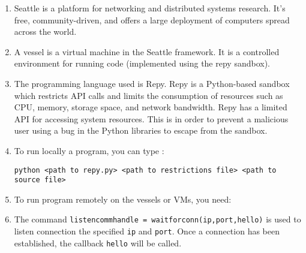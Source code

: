 \documentclass[12pt]{article}
\newcommand{\bash}[1]{\texttt{#1}}
\begin{document}
\begin{enumerate}
\item Seattle is a platform for networking and distributed systems research. It's free, community-driven, and offers a large deployment of computers spread across the world.

\item A vessel is a virtual machine in the Seattle framework. It is a controlled environment for running code (implemented using the repy sandbox).

\item The programming language used is Repy. Repy is a Python-based sandbox which restricts API calls and limits the consumption of resources such as CPU, memory, storage space, and network bandwidth. Repy has a limited API for accessing system resources. This is in order to prevent a malicious user using a bug in the Python libraries to escape from the sandbox.

\item To run locally a program, you can type : 

\texttt{python <path to repy.py> <path to restrictions file> <path to source file>}

\item  To run program remotely on the vessels or VMs, you need: 


\item The command \texttt{listencommhandle = waitforconn(ip,port,hello)} is used to listen connection the specified \bash{ip} and \bash{port}. Once a connection has been established, the callback \bash{hello} will be called.


\end{enumerate}
\end{document}

